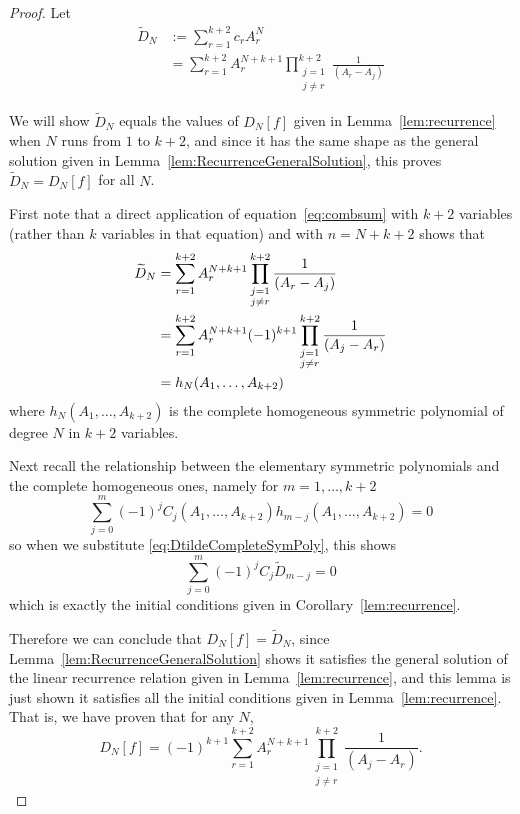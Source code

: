 \documentclass[12pt,a4paper,reqno]{amsart}
\theoremstyle{remark}
\numberwithin{equation}{section}
\begin{document}
\begin{proof}
Let
\begin{align*}
\widetilde D_N &:= \sum_{r=1}^{k+2} c_r A_r^N\\
&=\sum_{r=1}^{k+2} A_r^{N+k+1} \prod_{\substack{j=1 \\ j \neq r}}^{k+2} \frac{1}{(A_r - A_j)}
\end{align*}

We will show $\widetilde D_N$ equals the values of $D_N[f]$ given in Lemma~\ref{lem:recurrence} when $N$ runs from $1$ to $k+2$, and since it has the same shape as the general solution given in Lemma~\ref{lem:RecurrenceGeneralSolution}, this proves $\widetilde D_N = D_N[f]$ for all $N$.

First note that a direct application of equation~\eqref{eq:combsum} with $k+2$ variables (rather than $k$ variables in that equation) and with $n=N+k+2$ shows that
\begin{align}
\widetilde D_N &= \sum_{r=1}^{k+2} A_r^{N+k+1} \prod_{\substack{j=1 \\ j \neq r}}^{k+2} \frac{1}{(A_r - A_j)} \notag\\
&= \sum_{r=1}^{k+2} A_r^{N+k+1}  (-1)^{k+1} \prod_{\substack{j=1 \\ j \neq r}}^{k+2} \frac{1}{(A_j - A_r)} \notag\\
&= h_{N}(A_1,\dots,A_{k+2}) \label{eq:DtildeCompleteSymPoly}
\end{align}
where $h_N(A_1,\dots,A_{k+2})$ is the complete homogeneous symmetric polynomial of degree $N$ in $k+2$ variables.

Next recall the relationship between the elementary symmetric polynomials and the complete homogeneous ones, namely for $m=1,\dots,k+2$
\[
\sum_{j=0}^m (-1)^j C_j\left(A_1,\dots,A_{k+2}\right) h_{m-j}\left(A_1,\dots,A_{k+2}\right) = 0
\]
so when we substitute \eqref{eq:DtildeCompleteSymPoly}, this shows
\[
\sum_{j=0}^m (-1)^j C_j \widetilde D_{m-j} = 0
\]
which is exactly the initial conditions given in Corollary~\ref{lem:recurrence}.

Therefore we can conclude that $D_N[f] = \widetilde D_N$, since Lemma~\ref{lem:RecurrenceGeneralSolution} shows it satisfies the general solution of the linear recurrence relation given in Lemma~\ref{lem:recurrence}, and this lemma is just shown it satisfies all the initial conditions given in Lemma~\ref{lem:recurrence}. That is, we have proven that for any $N$,
\begin{equation}\label{eq:DNfClosedForm}
D_N[f] = (-1)^{k+1} \sum_{r=1}^{k+2}  A_r^{N+k+1} \prod_{\substack{j=1 \\ j \neq r}}^{k+2} \frac{1}{(A_j - A_r)}.
\end{equation}
\end{proof}
\end{document}
